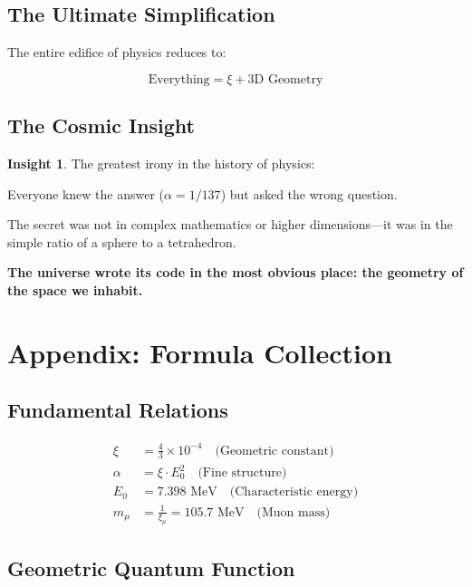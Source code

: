 \documentclass[12pt,a4paper]{article}
\theoremstyle{definition}
\newtheorem{insight}{Insight}[section]
\begin{document}
	\subsection{The Ultimate Simplification}
	
	The entire edifice of physics reduces to:
	
	\begin{equation}
		\boxed{\text{Everything} = \xi + \text{3D Geometry}}
	\end{equation}
	
	\subsection{The Cosmic Insight}
	
	\begin{insight}
		The greatest irony in the history of physics:
		
		Everyone knew the answer ($\alpha = 1/137$) but asked the wrong question.
		
		The secret was not in complex mathematics or higher dimensions---it was in the simple ratio of a sphere to a tetrahedron.
		
		\textbf{The universe wrote its code in the most obvious place: the geometry of the space we inhabit.}
	\end{insight}
	
	\newpage
	\section{Appendix: Formula Collection}
	
	\subsection{Fundamental Relations}
	
	\begin{align}
		\xi &= \frac{4}{3} \times 10^{-4} \quad \text{(Geometric constant)}\\
		\alpha &= \xi \cdot E_0^2 \quad \text{(Fine structure)}\\
		E_0 &= 7.398 \text{ MeV} \quad \text{(Characteristic energy)}\\
		m_\mu &= \frac{1}{\xi_\mu} = 105.7 \text{ MeV} \quad \text{(Muon mass)}
	\end{align}
	
	\subsection{Geometric Quantum Function}
	
\end{document}
